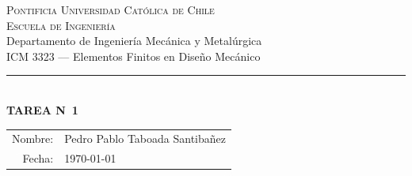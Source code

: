 \documentclass[11pt]{article}
\begin{document}
\begin{center}
    {\scshape\large Pontificia Universidad Cat\'olica de Chile}\\[2pt]
    {\scshape Escuela de Ingenier\'ia}\\[2pt]
    {\small Departamento de Ingenier\'ia Mec\'anica y Metal\'urgica}\\[2pt]
    {\small ICM 3323 --- Elementos Finitos en Dise\~no Mec\'anico}\\[10pt]
    {\color{ucred}\rule{0.42\linewidth}{0.6pt}}\\[10pt]
    {\Huge\bfseries\color{ucred} TAREA N\textdegree\ 1}
\end{center}

\vspace{4pt}
\begin{flushright}
\renewcommand{\arraystretch}{1.4}
\begin{tabular}{rl}
    Nombre: & Pedro Pablo Taboada Santibañez \\
    Fecha:  & \today\\
\end{tabular}
\end{flushright}

\vspace{0.6cm}


\end{document}
